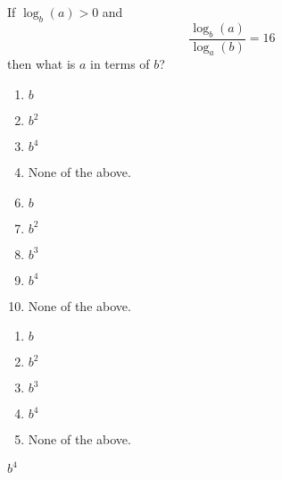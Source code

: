 

 If $\log_{b}(a)>0$ and 
\[\frac{\log_{b}(a)}{\log_{a}(b)}=16\] then what is $a$ in terms of $b$?


\ifsat
	\begin{enumerate}[label=\Alph*)]
		\item   $b$
		\item  $b^{2}$
		\item  $b^{4}$%
		\item  None of the above.
	\end{enumerate}
\else
\fi

\ifacteven
	\begin{enumerate}[label=\textbf{\Alph*.},itemsep=\fill,align=left]
		\setcounter{enumii}{5}
		\item   $b$
		\item  $b^{2}$
		\item  $b^{3}$
		\addtocounter{enumii}{1}
		\item  $b^{4}$%
		\item  None of the above.
	\end{enumerate}
\else
\fi

\ifactodd
	\begin{enumerate}[label=\textbf{\Alph*.},itemsep=\fill,align=left]
		\item   $b$
		\item  $b^{2}$
		\item  $b^{3}$
		\item  $b^{4}$%
		\item  None of the above.
	\end{enumerate}
\else
\fi

\ifgridin
  $b^{4}$%
		
\else
\fi

